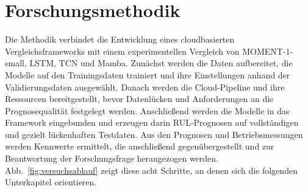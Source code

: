 \chapter{Forschungsmethodik}\label{cha:methodologicalApproach}

Die Methodik verbindet die Entwicklung eines cloudbasierten Vergleichsframeworks mit einem experimentellen Vergleich von MOMENT-1-small, \ac{LSTM}, \ac{TCN} und Mamba. Zunächst werden die Daten aufbereitet, die Modelle auf den Trainingsdaten trainiert und ihre Einstellungen anhand der Validierungsdaten ausgewählt. Danach werden die Cloud-Pipeline und ihre Ressourcen bereitgestellt, bevor Datenlücken und Anforderungen an die Prognosequalität festgelegt werden. Anschließend werden die Modelle in das Framework eingebunden und erzeugen darin \ac{RUL}-Prognosen auf vollständigen und gezielt lückenhaften Testdaten. Aus den Prognosen und Betriebsmessungen werden Kennwerte ermittelt, die anschließend gegenübergestellt und zur Beantwortung der Forschungsfrage herangezogen werden. Abb.~\ref{fig:versuchsablauf} zeigt diese acht Schritte, an denen sich die folgenden Unterkapitel orientieren.

